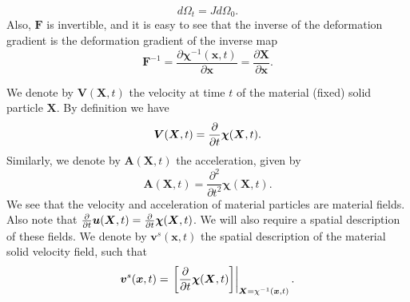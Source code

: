 \begin{equation}
d\Omega_{t}=Jd\Omega_{0}.
\label{j_volume}
\end{equation}
Also, $\boldsymbol{F}$ is invertible, and it is easy to see that the inverse of the deformation gradient is the deformation gradient of the inverse map
\begin{equation}
\boldsymbol{F}^{-1}=\frac{\partial \boldsymbol{\chi}^{-1}(\boldsymbol{x},t)}{\partial \boldsymbol{x} }=\frac{\partial \boldsymbol{X}}{\partial \boldsymbol{x} }.
\end{equation}
\begin{comment}
$\boldsymbol{F}$ can also be used to map between surfaces in the two configurations. Consider a surface element $dA$, oriented by the unit normal vector $\boldsymbol{N}$ in the undeformed configuration, and ${d}a$, a surface element in the deformed configuration, oriented by the unit normal vector $\boldsymbol{n}$, then
\begin{equation}
 \boldsymbol{n}  {d}a=J \boldsymbol{F}^{-T}  \boldsymbol{N} dA.
\label{eqn:push_backward}.
\end{equation}
For a detailed derivation see section 4.6.3 in \cite{gonzalez2008first} (Might not actually need this for this document).
\end{comment}
We denote by $\boldsymbol{V}(\boldsymbol{X},t)$ the velocity at time $t$ of the material (fixed) solid particle $\boldsymbol{X}$. By definition we have
\begin{equation}
 \boldsymbol{V}(\boldsymbol{X},t)= \frac{\partial }{\partial t}\boldsymbol\chi(\boldsymbol{X},t).
\end{equation}
Similarly, we denote by $\boldsymbol{A}(\boldsymbol{X},t)$ the acceleration, given by
\begin{equation}
 \boldsymbol{A}(\boldsymbol{X},t)= \frac{\partial^{2}}{\partial t^{2}}\boldsymbol\chi(\boldsymbol{X},t).
\end{equation}
We see that the velocity and acceleration of material particles are material fields. Also note that $\frac{\partial }{\partial t}\boldsymbol{u}(\boldsymbol{X},t)=\frac{\partial }{\partial t}\boldsymbol\chi(\boldsymbol{X},t)$. We will also require a spatial description of these fields. We denote by $\boldsymbol{v}^{s}(\boldsymbol{x},t)$ the spatial description of the material solid velocity field, such that
\begin{equation}
\label{eqn:vs_spatial}
 \boldsymbol{v}^{s}(\boldsymbol{x},t)= \left. \left[ \frac{\partial }{\partial t}\boldsymbol\chi(\boldsymbol{X},t) \right] \right|_{\boldsymbol{X}={\chi}^{-1}(\boldsymbol{x},t)}.
\end{equation}
